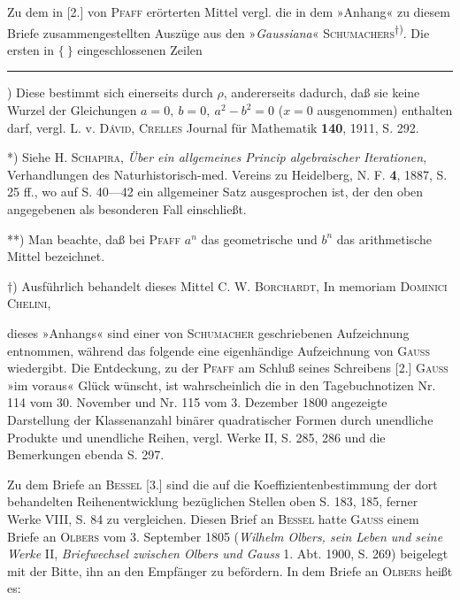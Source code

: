 \par\indent Zu dem in [2.] von \textsc{Pfaff} erörterten Mittel vergl. die in dem »Anhang« zu diesem Briefe zusammengestellten Auszüge aus den »\textit{Gaussiana}« \textsc{Schumachers}\textsuperscript{$\dagger$)}. Die ersten in $\bigl\{\ \bigr\}$ eingeschlossenen Zeilen
\par\smallskip\noindent\rule{.25\linewidth}{.4pt}\par
{\small
\par\indent *) Diese bestimmt sich einerseits durch $\rho$, andererseits dadurch, daß sie keine Wurzel der Gleichungen $a=0,\ b=0,\ a^2-b^2=0$ ($x=0$ ausgenommen) enthalten darf, vergl. L. v. \textsc{Dávid}, \textsc{Crelles} Journal für Mathematik \textbf{140}, 1911, S. 292.
\par\indent **) Siehe H. \textsc{Schapira}, \textit{Über ein allgemeines Princip algebraischer Iterationen}, Verhandlungen des Naturhistorisch-med. Vereins zu Heidelberg, N. F. \textbf{4}, 1887, S. 25 ff., wo auf S. 40—42 ein allgemeiner Satz ausgesprochen ist, der den oben angegebenen als besonderen Fall einschließt.
\par\indent ***) Man beachte, daß bei \textsc{Pfaff} $a^n$ das geometrische und $b^n$ das arithmetische Mittel bezeichnet.
\par\indent $\dagger$) Ausführlich behandelt dieses Mittel C. W. \textsc{Borchardt}, In memoriam \textsc{Dominici Chelini},
\par}
\clearpage
\fancyhead{}
\noindent dieses »Anhangs« sind einer von \textsc{Schumacher} geschriebenen Aufzeichnung entnommen, während das folgende eine eigenhändige Aufzeichnung von \textsc{Gauss} wiedergibt. Die Entdeckung, zu der \textsc{Pfaff} am Schluß seines Schreibens [2.] \textsc{Gauss} »im voraus« Glück wünscht, ist wahrscheinlich die in den Tagebuchnotizen Nr. 114 vom 30. November und Nr. 115 vom 3. Dezember 1800 angezeigte Darstellung der Klassenanzahl binärer quadratischer Formen durch unendliche Produkte und unendliche Reihen, vergl. Werke II, S. 285, 286 und die Bemerkungen ebenda S. 297.
\par\indent Zu dem Briefe an \textsc{Bessel} [3.] sind die auf die Koeffizientenbestimmung der dort behandelten Reihenentwicklung bezüglichen Stellen oben S. 183, 185, ferner Werke VIII, S. 84 zu vergleichen. Diesen Brief an \textsc{Bessel} hatte \textsc{Gauss} einem Briefe an \textsc{Olbers} vom 3. September 1805 (\textit{Wilhelm Olbers, sein Leben und seine Werke} II, \textit{Briefwechsel zwischen Olbers und Gauss} 1. Abt. 1900, S. 269) beigelegt mit der Bitte, ihn an den Empfänger zu befördern. In dem Briefe an \textsc{Olbers} heißt es:
